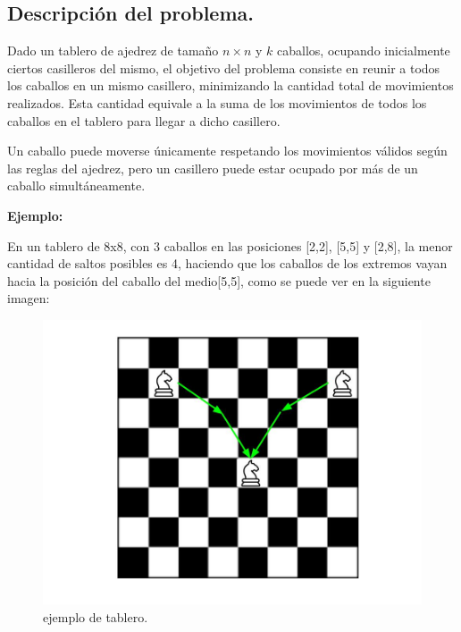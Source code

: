 \subsection{Descripción del problema.}

\vspace*{0.3cm}

Dado un tablero de ajedrez de tamaño $n \times n$ y $k$ caballos, ocupando
inicialmente ciertos casilleros del mismo, el objetivo del problema consiste
en reunir a todos los caballos en un mismo casillero, minimizando la
cantidad total de movimientos realizados. Esta cantidad equivale a la suma
de los movimientos de todos los caballos en el tablero para llegar a dicho
casillero.

Un caballo puede moverse únicamente respetando los movimientos válidos según
las reglas del ajedrez, pero un casillero puede estar ocupado por más de un
caballo simultáneamente.

\vspace*{0.5cm}

\textbf{Ejemplo:}

En un tablero de 8x8, con 3 caballos en las posiciones [2,2], [5,5] y [2,8],
la menor cantidad de saltos posibles es 4, haciendo que los caballos de los
extremos vayan hacia la posición del caballo del medio[5,5], como se puede ver
en la siguiente imagen:

\begin{figure}[htb]
  \begin{center}
      \includegraphics[scale=0.25]{imagenes/caballos.jpg}
  \end{center}
  \caption{ejemplo de tablero.}
\end{figure}


